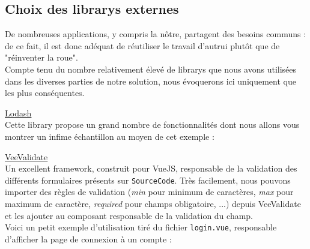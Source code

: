 \subsection*{Choix des \glspl{library} externes}

De nombreuses applications, y compris la nôtre, partagent des besoins communs : de ce fait, il est donc adéquat de réutiliser le travail d'autrui plutôt que de "réinventer la roue". \\

Compte tenu du nombre relativement élevé de \glspl{library} que nous avons utilisées dans les diverses parties de notre solution, nous évoquerons ici uniquement que les plus conséquentes. \\



\underline{\href{https://lodash.com/}{Lodash}}\\

Cette \gls{library} propose un grand nombre de fonctionnalités dont nous allons vous montrer un infime échantillon au moyen de cet exemple :



\pagebreak
{}

\noindent\underline{\href{https://logaretm.github.io/vee-validate/}{VeeValidate}}\\

Un excellent framework, construit pour VueJS, responsable de la validation des différents formulaires présents sur \texttt{SourceCode}. Très facilement, nous pouvons importer des règles de validation (\textit{min} pour minimum de caractères, \textit{max} pour maximum de caractère, \textit{required} pour champs obligatoire, ...) depuis VeeValidate et les ajouter au composant responsable de la validation du champ.\\

Voici un petit exemple d'utilisation tiré du fichier \texttt{login.vue}, responsable d'afficher la page de connexion à un compte :\\

